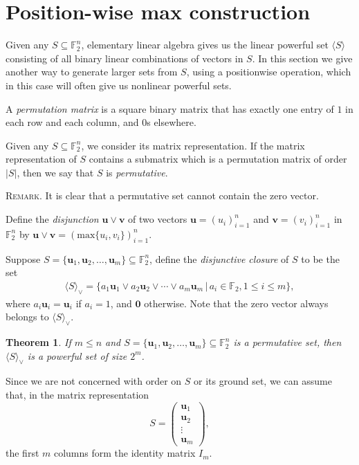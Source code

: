 \documentclass[12pt]{article}
\newtheorem{thm}{Theorem}[section]
\def\pf{\noindent {\it Proof.\ }}
\begin{document}
\section{Position-wise max construction}
\label{sec:posn-wise-max}

Given any $S\subseteq\mathbb{F}_2^n$, elementary linear algebra gives us the
linear powerful set $\langle S\rangle$ consisting of all binary linear combinations of vectors
in $S$.  In this section we give another way to generate larger sets from $S$,
using a positionwise operation, which in this case will often give us nonlinear powerful sets.

A \emph{permutation matrix} is a square binary matrix that has exactly one entry of $1$ in each row and each column, and $0$s elsewhere.

Given any $S\subseteq\mathbb{F}_2^n$, we consider its matrix representation. If the matrix representation of $S$ contains a submatrix which is a permutation matrix of order $|S|$, then we say that $S$ is \emph{permutative}.

\textsc{Remark.} It is clear that a permutative set cannot contain the zero vector.

Define the \emph{disjunction} $\mathbf{u}\vee\mathbf{v}$ of two vectors
$\mathbf{u}=(u_i)_{i=1}^{n}$ and $\mathbf{v}=(v_i)_{i=1}^{n}$ in $\mathbb{F}_2^{n}$
by $\mathbf{u}\vee\mathbf{v}=(\mathrm{max}\{u_i,v_i\})_{i=1}^{n}$.

Suppose $S=\{\mathbf{u}_1,\mathbf{u}_2,\ldots,\mathbf{u}_m\}\subseteq\mathbb{F}_2^n$, define the \textit{disjunctive closure} of $S$ to be the set
\begin{align*}
\langle S\rangle_{\vee}=\{a_1\mathbf{u}_1\vee a_2\mathbf{u}_2\vee\cdots\vee a_m\mathbf{u}_m\,|\,a_i\in\mathbb{F}_2, 1\leq i\leq m\},
\end{align*}
where $a_i\mathbf{u}_i=\mathbf{u}_i$ if $a_i=1$, and $\mathbf{0}$ otherwise.
Note that the zero vector always belongs to $\langle S\rangle_{\vee}$.

\begin{thm}
If $m\leq n$ and $S=\{\mathbf{u}_1,\mathbf{u}_2,\ldots,\mathbf{u}_m\}\subseteq\mathbb{F}_2^n$ is a permutative set, then $\langle S\rangle_{\vee}$ is a powerful set of size $2^{m}$.
\end{thm}

\pf Since we are not concerned with order on $S$ or its ground set, we can assume that,
in the matrix representation
\begin{equation*}
S=\left(
\begin{array}{c}
\mathbf{u}_1   \\
\mathbf{u}_2   \\
\vdots         \\
\mathbf{u}_m
\end{array}
\right),
\end{equation*}
the first $m$ columns form the identity matrix $I_{m}$.
\end{document}
